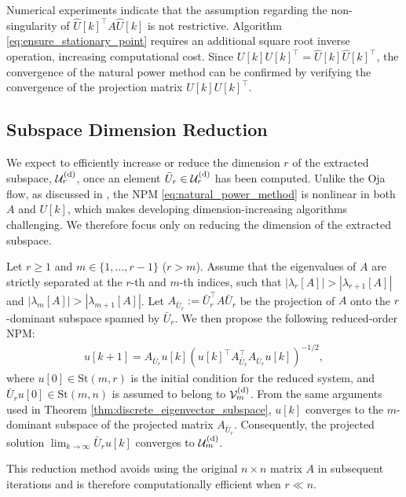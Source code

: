 \documentclass{ifacconf}
\begin{document}
Numerical experiments indicate that the assumption regarding the non-singularity of $\hat{U}[k]^{\top}A\hat{U}[k]$ is not restrictive. 
Algorithm \eqref{eq:ensure_stationary_point} requires an additional square root inverse operation, increasing computational cost. 
Since $U[k]U[k]^{\top} = \hat{U}[k] \hat{U}[k]^{\top}$, the convergence of the natural power method can be confirmed by verifying the convergence of the projection matrix $U[k]U[k]^{\top}$. 


\subsection{Subspace Dimension Reduction}

We expect to efficiently increase or reduce the dimension $r$ of the extracted subspace, $\mathcal{U}_{r}^{\rm (d)}$, once an element $\bar{U}_{r} \in \mathcal{U}_{r}^{\rm (d)}$ has been computed.
Unlike the Oja flow, as discussed in \cite[\S III.D]{TsuzukiOhki2025global}, the NPM \eqref{eq:natural_power_method} is nonlinear in both $A$ and $U[k]$, which makes developing dimension-increasing algorithms challenging. We therefore focus only on reducing the dimension of the extracted subspace.

Let $r \geq 1$ and $m \in \{1,\dots ,r-1\}$ ($r>m$). Assume that the eigenvalues of $A$ are strictly separated at the $r$-th and $m$-th indices, such that $| \lambda _{r}[A] | > |\lambda _{r+1}[A] |$ and $| \lambda _{m}[A] | > |\lambda _{m+1}[A] |$.
Let $A_{\bar{U}_{r}} := \bar{U}_{r}^{\top} A \bar{U}_{r}$ be the projection of $A$ onto the $r$-dominant subspace spanned by $\bar{U}_{r}$.
We then propose the following reduced-order NPM:
\begin{align}
    u[k+1] = A_{\bar{U}_{r}} u[k] ( u[k]^{\top}A_{\bar{U}_{r}}^{\top} A_{\bar{U}_{r}} u[k]) ^{-1/2},
    \label{eq:reduced_npm}
\end{align}
where $u[0] \in \mathrm{St}(m,r)$ is the initial condition for the reduced system, and $\bar{U}_{r} u[0] \in \mathrm{St}(m,n)$ is assumed to belong to $\mathcal{V}_{m}^{{\rm (d)}}$.
From the same arguments used in Theorem \ref{thm:discrete_eigenvector_subspace}, $u[k]$ converges to the $m$-dominant subspace of the projected matrix $A_{\bar{U}_{r}}$. Consequently, the projected solution $\lim _{k\to \infty} \bar{U}_{r} u[k]$ converges to $\mathcal{U}_{m}^{\rm (d)}$.

This reduction method avoids using the original $n \times n$ matrix $A$ in subsequent iterations and is therefore computationally efficient when $r\ll n$.
\end{document}
